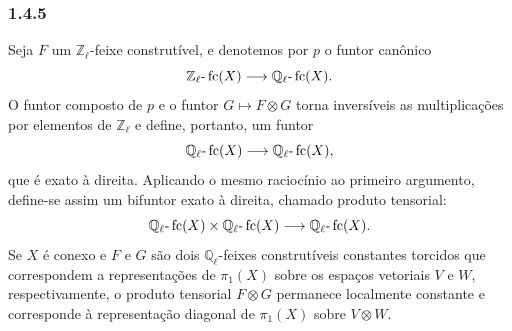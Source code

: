 \subsubsection*{1.4.5}
Seja \(F\) um \(\mathbb Z_\ell\)-feixe construtível, e denotemos por \(p\) o funtor canônico
\[
\mathbb Z_\ell\text{-}\operatorname{fc}(X)\longrightarrow \mathbb Q_\ell\text{-}\operatorname{fc}(X).
\]
O funtor composto de \(p\) e o funtor \(G\mapsto F\otimes G\) torna inversíveis as multiplicações por elementos de \(\mathbb Z_\ell\) e define, portanto, um funtor
\[
\mathbb Q_\ell\text{-}\operatorname{fc}(X)\longrightarrow \mathbb Q_\ell\text{-}\operatorname{fc}(X),
\]
que é exato à direita. Aplicando o mesmo raciocínio ao primeiro argumento, define-se assim um bifuntor exato à direita, chamado produto tensorial:
\[
\mathbb Q_\ell\text{-}\operatorname{fc}(X)\times \mathbb Q_\ell\text{-}\operatorname{fc}(X)
\longrightarrow \mathbb Q_\ell\text{-}\operatorname{fc}(X).
\]
Se \(X\) é conexo e \(F\) e \(G\) são dois \(\mathbb Q_\ell\)-feixes construtíveis constantes torcidos que correspondem a representações de \(\pi_1(X)\) sobre os espaços vetoriais \(V\) e \(W\), respectivamente, o produto tensorial \(F\otimes G\) permanece localmente constante e corresponde à representação diagonal de \(\pi_1(X)\) sobre \(V\otimes W\).

